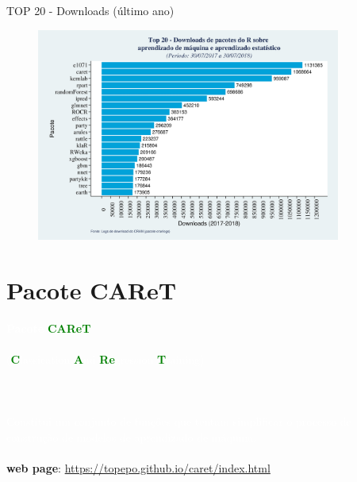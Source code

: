 \documentclass[12pt,ignorenonframetext,aspectratio=1610]{beamer}
\begin{document}
\begin{frame}[t]{TOP 20 - Downloads (último ano)}
	
	\begin{figure}[H]
		\centering
		\includegraphics[width=10cm, height=7cm]{Fig/dwl_year.jpeg}
	\end{figure}
	
\end{frame}	

\section{Pacote CAReT}

\begin{frame}[c]{}
	
	\begin{center}

	{\Huge \textcolor{white}{\textbf{Pacote}} \textcolor{green}{\textbf{CAReT}}} \\~\\
	
	{\Large\textcolor{white}{(}\textcolor{green}{\textbf{C}}\textcolor{white}{lassication} \textcolor{green}{\textbf{A}}\textcolor{white}{nd} \textcolor{green}{\textbf{Re}}\textcolor{white}{gression} \textcolor{green}{\textbf{T}}\textcolor{white}{raining)}} \\~\\
		
	\cite{kuhn2013applied, R-caret} \\~\\

	\hspace{1.5cm} \textcolor{white}{Constitui um conjunto de funções que tentam simplificar o processo de \\ \hspace{1.5cm} construção de modelos de aprendizado de máquina.} \\~\\
		
		
	\textbf{web page}: \href{https://topepo.github.io/caret/index.html}{https://topepo.github.io/caret/index.html}
	\end{center}
	
\end{frame}
\end{document}
